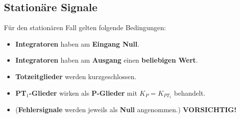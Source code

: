 	\subsection{Stationäre Signale}
	Für den stationären Fall gelten folgende Bedingungen:
	\begin{itemize}
    	\item \textbf{Integratoren} haben am \textbf{Eingang Null}.
    	\item \textbf{Integratoren} haben am \textbf{Ausgang} einen \textbf{beliebigen Wert}.
    	\item \textbf{Totzeitglieder} werden kurzgeschlossen.
    	\item \textbf{PT$_1$-Glieder} wirken als \textbf{P-Glieder} mit $K_P = K_{PT_1}$ behandelt.
      \item (\textbf{Fehlersignale} werden jeweils als \textbf{Null} angenommen.) \textbf{VORSICHTIG!}
  	\end{itemize}